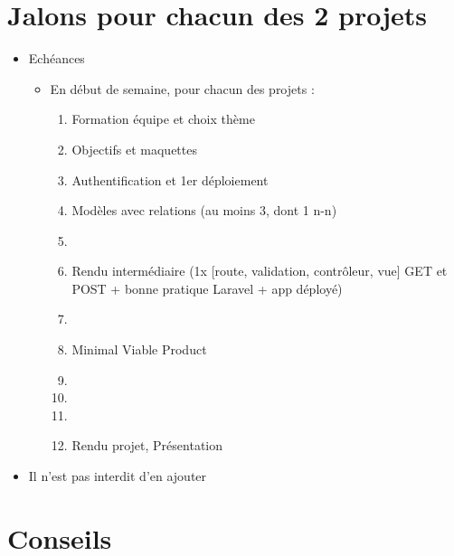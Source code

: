 \hypertarget{jalons-pour-chacun-des-2-projets}{%
\section{Jalons pour chacun des 2
projets}\label{jalons-pour-chacun-des-2-projets}}

\begin{itemize}
\tightlist
\item
  Echéances

  \begin{itemize}
  \tightlist
  \item
    En début de semaine, pour chacun des projets :

    \begin{enumerate}
    \def\labelenumi{\arabic{enumi}.}
    \tightlist
    \item
      Formation équipe et choix thème
    \item
      Objectifs et maquettes
    \item
      Authentification et 1er déploiement
    \item
      Modèles avec relations (au moins 3, dont 1 n-n)
    \item
    \item
      {Rendu intermédiaire (1x {[}route, validation, contrôleur, vue{]}
      GET et POST + bonne pratique Laravel + app déployé)}
    \item
    \item
      Minimal Viable Product
    \item
    \item
    \item
    \item
      {Rendu projet, Présentation}
    \end{enumerate}
  \end{itemize}
\item
  Il n'est pas interdit d'en ajouter
\end{itemize}

\hypertarget{conseils}{%
\section{Conseils}\label{conseils}}

